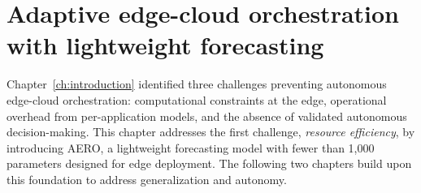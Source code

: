 \chapter{Adaptive edge-cloud orchestration with lightweight forecasting}
\label{ch:adaptive-orchestration}

Chapter~\ref{ch:introduction} identified three challenges preventing autonomous edge-cloud orchestration: computational constraints at the edge, operational overhead from per-application models, and the absence of validated autonomous decision-making. This chapter addresses the first challenge, \textit{resource efficiency}, by introducing \ac{AERO}, a lightweight forecasting model with fewer than 1,000 parameters designed for edge deployment. The following two chapters build upon this foundation to address generalization and autonomy.









